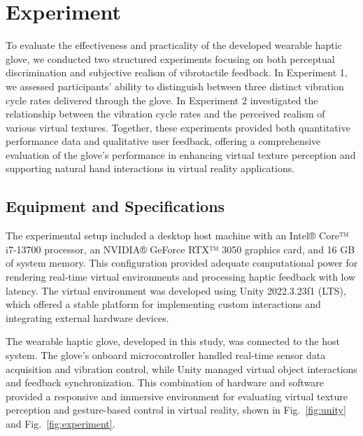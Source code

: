 \chapter{Experiment} %

\label{Chapter4} %






To evaluate the effectiveness and practicality of the developed wearable haptic glove, we conducted two structured experiments focusing on both perceptual discrimination and subjective realism of vibrotactile feedback. 
In Experiment 1, we assessed participants' ability to distinguish between three distinct vibration cycle rates delivered through the glove. 
In Experiment 2 investigated the relationship between the vibration cycle rates and the perceived realism of various virtual textures. 
Together, these experiments provided both quantitative performance data and qualitative user feedback, offering a comprehensive evaluation of the glove’s performance in enhancing virtual texture perception and supporting natural hand interactions in virtual reality applications.

\section{Equipment and Specifications}
The experimental setup included a desktop host machine with an Intel® Core™ i7-13700 processor, an NVIDIA® GeForce RTX™ 3050 graphics card, and 16 GB of system memory. This configuration provided adequate computational power for rendering real-time virtual environments and processing haptic feedback with low latency. The virtual environment was developed using Unity 2022.3.23f1 (LTS), which offered a stable platform for implementing custom interactions and integrating external hardware devices.

The wearable haptic glove, developed in this study, was connected to the host system. The glove’s onboard microcontroller handled real-time sensor data acquisition and vibration control, while Unity managed virtual object interactions and feedback synchronization. This combination of hardware and software provided a responsive and immersive environment for evaluating virtual texture perception and gesture-based control in virtual reality, shown in Fig.~\ref{fig:unity} and Fig.~\ref{fig:experiment}.

